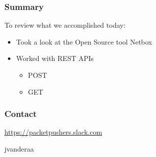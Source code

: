 \documentclass[aspectratio=169]{beamer}
\begin{document}
  \begin{frame}
    \frametitle{Summary}
      To review what we accomplished today:
      \begin{itemize}
        \item <2-> Took a look at the Open Source tool Netbox
        \item <3-> Worked with REST APIs
        \begin{itemize}
            \item <3-> POST
            \item <4-> GET
        \end{itemize}
      \end{itemize}
  \end{frame}

  \begin{frame}
    \frametitle{Contact}
    \huge
    \begin{center}
      \url{https://packetpushers.slack.com}
    \end{center}
    \begin{center}
      \normalsize
      \faSlack \hspace{.1cm}jvanderaa  
    \end{center}
  \end{frame}
\end{document}
